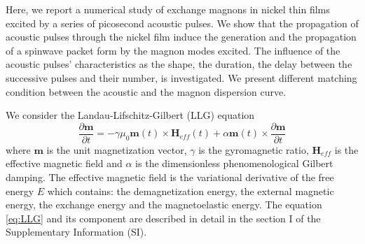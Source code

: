 \documentclass[%
superscriptaddress,
preprint,
showpacs,
amsmath,
amssymb,
aps,
prl,
]{revtex4-1}
\begin{document}
Here, we report a numerical study of exchange magnons in nickel thin films excited by a series of picosecond acoustic pulses.
We show that the propagation of acoustic pulses through the nickel film induce the generation and the propagation of a spinwave packet form by the magnon modes excited.
The influence of the acoustic pulses' characteristics as the shape, the duration, the delay between the successive pulses and their number, is investigated.
We present different matching condition between the acoustic and the magnon dispersion curve.


We consider the Landau-Lifschitz-Gilbert (LLG) equation
\begin{equation}
	\frac{\partial \mathbf{m}}{\partial t} = - \gamma \mu_0 \mathbf{m} \left( t \right) \times \mathbf{H}_{eff} \left( t \right) + \alpha \mathbf{m} \left( t \right) \times \frac{\partial \mathbf{m}}{\partial t}
	\label{eq:LLG}
\end{equation}
where $\mathbf{m}$ is the unit magnetization vector, $\gamma$ is the gyromagnetic ratio, $\mathbf{H}_{eff}$ is the effective magnetic field and $\alpha$ is the dimensionless phenomenological Gilbert damping.
The effective magnetic field is the variational derivative of the free energy $E$ which contains: the demagnetization energy, the external magnetic energy, the exchange energy and the magnetoelastic energy.
The equation \eqref{eq:LLG} and its component are described in detail in the section I of the Supplementary Information (SI).
\end{document}
